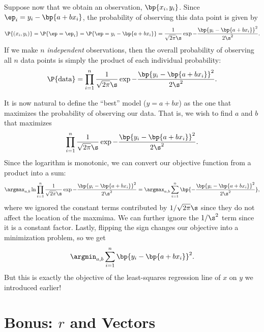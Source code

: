 Suppose now that we obtain an observation, $\bp{x_i, y_i}$. Since $\ep_i = y_i - \bp{a + bx_i}$, the probability of observing this data point is given by \[\P{(x_i, y_i)} = \P{\ep = \ep_i} = \P{\ep = y_i - \bp{a + bx_i}} = \frac1{\sqrt{2\pi} \s} \exp{-\frac{\bp{y_i - \bp{a + bx_i}}^2}{2\s^2}}.\] If we make $n$ \emph{independent} observations, then the overall probability of observing all $n$ data points is simply the product of each individual probability: \[\P{\text{data}} = \prod_{i = 1}^n \frac1{\sqrt{2\pi} \s} \exp{-\frac{\bp{y_i - \bp{a + bx_i}}^2}{2\s^2}}.\]

It is now natural to define the ``best'' model ($y = a + bx$) as the one that maximizes the probability of observing our data. That is, we wish to find $a$ and $b$ that maximizes \[\prod_{i = 1}^n \frac1{\sqrt{2\pi} \s} \exp{-\frac{\bp{y_i - \bp{a + bx_i}}^2}{2\s^2}}.\] Since the logarithm is monotonic, we can convert our objective function from a product into a sum: \[\argmax_{a, b} \ln \prod_{i = 1}^n \frac1{\sqrt{2\pi} \s} \exp{-\frac{\bp{y_i - \bp{a + bx_i}}^2}{2\s^2}} = \argmax_{a, b} \sum_{i = 1}^n \bp{-\frac{\bp{y_i - \bp{a + bx_i}}^2}{2\s^2}},\] where we ignored the constant terms contributed by $1/\sqrt{2\pi} \s$ since they do not affect the location of the maxmima. We can further ignore the $1/\s^2$ term since it is a constant factor. Lastly, flipping the sign changes our objective into a minimization problem, so we get \[\argmin_{a, b} \sum_{i = 1}^n \bp{y_i - \bp{a + b x_i}}^2.\] But this is exactly the objective of the least-squares regression line of $x$ on $y$ we introduced earlier!

\section{Bonus: $r$ and Vectors}

